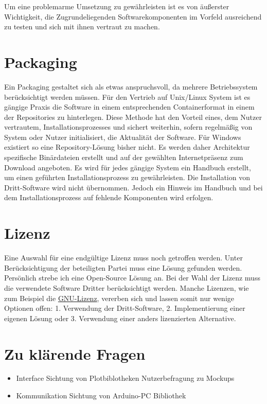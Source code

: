 Um eine problemarme Umsetzung zu gewährleisten ist es von äußerster Wichtigkeit, die Zugrundeliegenden Softwarekomponenten im Vorfeld ausreichend zu testen und sich mit ihnen vertraut zu machen. 
\section{Packaging}
Ein Packaging gestaltet sich als etwas anspruchsvoll, da mehrere Betriebssystem berücksichtigt werden müssen. Für den Vertrieb auf Unix/Linux System ist es gängige Praxis die Software in einem entsprechenden Containerformat in einem der Repositories zu hinterlegen. Diese Methode hat den Vorteil eines, dem Nutzer vertrautem, Installationsprozesses und sichert weiterhin, sofern regelmäßig von System oder Nutzer initialisiert, die Aktualität der Software. 
Für Windows existiert so eine Repository-Lösung bisher nicht. Es werden daher Architektur spezifische Binärdateien erstellt und auf der gewählten Internetpräsenz zum Download angeboten. 
Es wird für jedes gängige System ein Handbuch erstellt, um einen geführten Installationsprozess zu gewährleisten.
Die Installation von Dritt-Software wird nicht übernommen. Jedoch ein Hinweis im Handbuch und bei dem Installationsprozess auf fehlende Komponenten wird erfolgen.
\section{Lizenz}
Eine Auswahl für eine endgültige Lizenz muss noch getroffen werden. Unter Berücksichtigung der beteiligten Partei muss eine Lösung gefunden werden. Persönlich strebe ich eine Open-Source Lösung an.
Bei der Wahl der Lizenz muss die verwendete Software Dritter berücksichtigt werden. Manche Lizenzen, wie zum Beispiel die \href{https://www.gnu.org/licenses/licenses.html#GPL}{GNU-Lizenz}, vererben sich und lassen somit nur wenige Optionen offen: 1. Verwendung der Dritt-Software, 2. Implementierung einer eigenen Lösung oder 3. Verwendung einer anders lizenzierten Alternative.
\section{Zu klärende Fragen}
\begin{itemize}
 \item Interface
  \subitem Sichtung von Plotbiblotheken
  \subitem Nutzerbefragung zu Mockups
 \item Kommunikation
  \subitem Sichtung von Arduino-PC Bibliothek  
\end{itemize}


